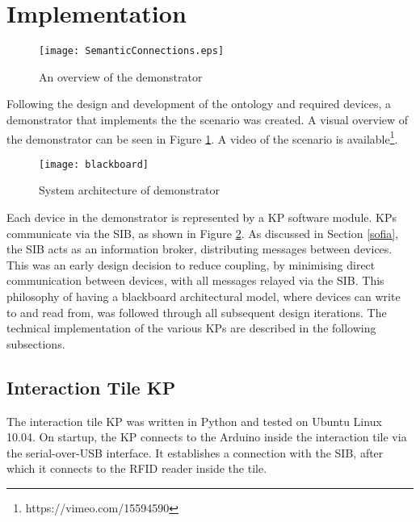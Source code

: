 \section{Implementation}
\label{D1Implementation}
\begin{figure}[bth]
\centering
\texttt{[image: SemanticConnections.eps]}
\caption{An overview of the demonstrator}
\label{semanticConnections}
\end{figure}

Following the design and development of the ontology and required devices, a demonstrator that implements the the scenario was created. A visual overview of the demonstrator can be seen in Figure \ref{semanticConnections}. A video of the scenario is available\footnote{https://vimeo.com/15594590}.

\begin{figure}[bth]
\centering
\texttt{[image: blackboard]}
\caption{System architecture of demonstrator}
\label{blackboardarch}
\end{figure}

Each device in the demonstrator is represented by a \ac{KP} software module. \acp{KP} communicate via the \ac{SIB}, as shown in Figure \ref{blackboardarch}. As discussed in Section \ref{sofia}, the \ac{SIB} acts as an information broker, distributing messages between devices. This was an early design decision to reduce coupling, by minimising direct communication between devices, with all messages relayed via the \ac{SIB}. This philosophy of having a blackboard architectural model, where devices can write to and read from, was followed through all subsequent design iterations. The technical implementation of the various \acp{KP} are described in the following subsections.


\subsection{Interaction Tile KP}

The interaction tile \ac{KP} was written in Python and tested on Ubuntu Linux 10.04. On startup, the \ac{KP} connects to the Arduino inside the interaction tile via the serial-over-USB interface. It establishes a connection with the \ac{SIB}, after which it connects to the \ac{RFID} reader inside the tile.

